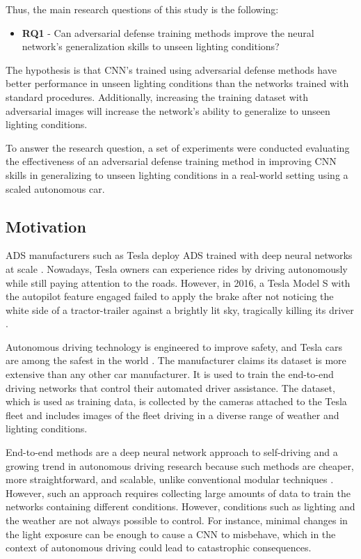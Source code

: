 \documentclass[12pt]{article}
\begin{document}
Thus, the main research questions of this study is the following:

\begin{itemize}
   \item \textbf{RQ1} - Can adversarial defense training methods improve the neural network's generalization skills to unseen lighting conditions?
\end{itemize}

The hypothesis is that CNN's trained using adversarial defense methods have better performance in unseen lighting conditions than the networks trained with standard procedures. Additionally, increasing the training dataset with adversarial images will increase the network's ability to generalize to unseen lighting conditions.

To answer the research question, a set of experiments were conducted evaluating the effectiveness of an adversarial defense training method in improving CNN skills in generalizing to unseen lighting conditions in a real-world setting using a scaled autonomous car.

\subsection{Motivation}

ADS manufacturers such as Tesla deploy ADS trained with deep neural networks at scale \parencite{teslaai}. Nowadays, Tesla owners can experience rides by driving autonomously while still paying attention to the roads. However, in 2016, a Tesla Model S with the autopilot feature engaged failed to apply the brake after not noticing the white side of a tractor-trailer against a brightly lit sky, tragically killing its driver \parencite{teslalost}.

Autonomous driving technology is engineered to improve safety, and Tesla cars are among the safest in the world \parencite{teslasafety}. The manufacturer claims its dataset is more extensive than any other car manufacturer. It is used to train the end-to-end driving networks that control their automated driver assistance. The dataset, which is used as training data, is collected by the cameras attached to the Tesla fleet and includes images of the fleet driving in a diverse range of weather and lighting conditions.

End-to-end methods are a deep neural network approach to self-driving and a growing trend in autonomous driving research because such methods are cheaper, more straightforward, and scalable, unlike conventional modular techniques \parencite{tampuu}. However, such an approach requires collecting large amounts of data to train the networks containing different conditions. However, conditions such as lighting and the weather are not always possible to control. For instance, minimal changes in the light exposure can be enough to cause a CNN to misbehave, which in the context of autonomous driving could lead to catastrophic consequences.
\end{document}
